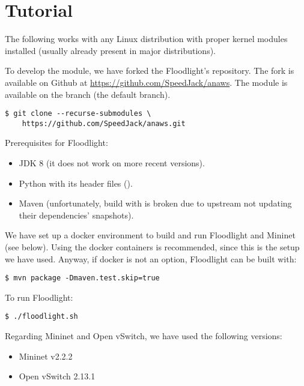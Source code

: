 \chapter{Tutorial}\label{appendix:tutorial}

The following works with any Linux distribution with proper kernel modules
installed (usually already present in major distributions).

To develop the module, we have forked the Floodlight's repository. The fork is
available on Github at \url{https://github.com/SpeedJack/anaws}. The module is
available on the  branch (the default branch).

\begin{verbatim}
$ git clone --recurse-submodules \
    https://github.com/SpeedJack/anaws.git
\end{verbatim}

Prerequisites for Floodlight:
\begin{itemize}
	\item JDK 8 (it does not work on more recent versions).
	\item Python with its header files ().
	\item Maven (unfortunately, build with  is broken due to
		upstream not updating their dependencies' snapshots).
\end{itemize}

We have set up a docker environment to build and run Floodlight and Mininet (see
below). Using the docker containers is recommended, since this is the setup we
have used. Anyway, if docker is not an option, Floodlight can be built with:

\begin{verbatim}
$ mvn package -Dmaven.test.skip=true
\end{verbatim}

To run Floodlight:

\begin{verbatim}
$ ./floodlight.sh
\end{verbatim}

Regarding Mininet and Open vSwitch, we have used the following versions:
\begin{itemize}
	\item Mininet v2.2.2
	\item Open vSwitch 2.13.1
\end{itemize}

